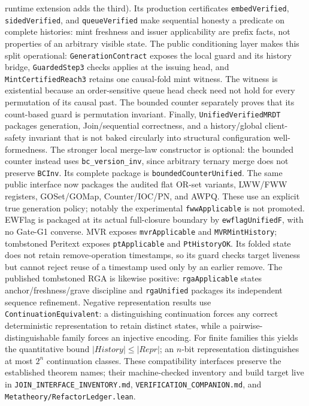 \documentclass[11pt]{article}
\newcommand{\lean}[1]{\texttt{#1}}
\begin{document}
runtime extension adds the third).  Its production certificates
\lean{embedVerified}, \lean{sidedVerified}, and \lean{queueVerified}
make sequential honesty a predicate on complete histories: mint freshness and
issuer applicability are prefix facts, not properties of an arbitrary visible
state.  The public conditioning layer makes this split operational:
\lean{GenerationContract} exposes the local guard and its history bridge,
\lean{GuardedStep3} checks applies at the issuing head, and
\lean{MintCertifiedReach3} retains one causal-fold mint witness.  The witness
is existential because an order-sensitive queue head check need not hold for
every permutation of its causal past.  The bounded counter separately proves
that its count-based guard is permutation invariant.  Finally,
\lean{UnifiedVerifiedMRDT} packages generation, Join/sequential correctness,
and a history/global client-safety invariant that is not baked circularly into
structural configuration well-formedness. The stronger local merge-law
constructor is optional: the bounded counter instead uses
\lean{bc\_version\_inv}, since arbitrary ternary merge does not preserve
\lean{BCInv}. Its complete package is \lean{boundedCounterUnified}.
The same public interface now packages the audited flat OR-set variants,
LWW/FWW registers, GOSet/GOMap, Counter/IOC/PN, and AWPQ.  These use an
explicit true generation policy; notably the experimental
\lean{fwwApplicable} is not promoted. EWFlag is packaged at its actual
full-closure boundary by \lean{ewflagUnifiedF}, with no Gate-G1 converse.
MVR exposes \lean{mvrApplicable} and \lean{MVRMintHistory}; tombstoned
Peritext exposes \lean{ptApplicable} and \lean{PtHistoryOK}. Its folded state
does not retain remove-operation timestamps, so its guard checks target
liveness but cannot reject reuse of a timestamp used only by an earlier
remove. The published tombstoned RGA is likewise positive:
\lean{rgaApplicable} states anchor/freshness/grave discipline and
\lean{rgaUnified} packages its independent sequence refinement.
Negative representation results use
\lean{ContinuationEquivalent}: a distinguishing continuation forces any
correct deterministic representation to retain distinct states, while a
pairwise-distinguishable family forces an injective encoding.  For finite
families this yields the quantitative bound
$|\mathit{History}| \leq |\mathit{Repr}|$; an $n$-bit representation
distinguishes at most $2^n$ continuation classes. These
compatibility interfaces preserve the established theorem names; their
machine-checked inventory and build target live in
\lean{JOIN\_INTERFACE\_INVENTORY.md},
\lean{VERIFICATION\_COMPANION.md}, and
\lean{Metatheory/RefactorLedger.lean}.
\fi\fi
\end{document}
